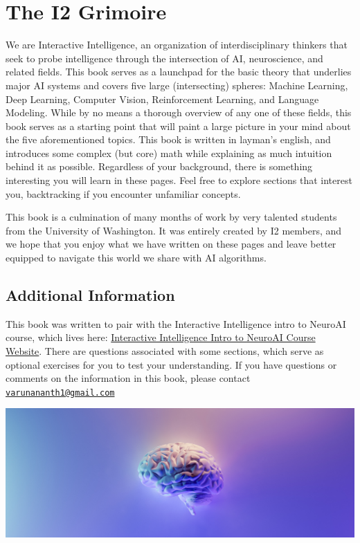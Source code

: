 \documentclass{article}
\begin{document}
\begingroup
\section*{The I2 Grimoire}
We are Interactive Intelligence, an organization of interdisciplinary
thinkers that seek to probe intelligence through the intersection of
AI, neuroscience, and related fields. This book serves as a launchpad
for the basic theory that underlies major AI systems and covers five
large (intersecting) spheres: Machine Learning, Deep Learning,
Computer Vision, Reinforcement Learning, and Language Modeling. While
by no means a thorough overview of any one of these fields, this book
serves as a starting point that will paint a large picture in your
mind about the five aforementioned topics. This book is written in
layman's english, and introduces some complex (but core) math while
explaining as much intuition behind it as possible. Regardless of
your background, there is something interesting you will learn in
these pages. Feel free to explore sections that interest you,
backtracking if you encounter unfamiliar concepts.

This book is a culmination of many months of work by very talented
students from the University of Washington. It was entirely created
by I2 members, and we hope that you enjoy what we have written on
these pages and leave better equipped to navigate this world we share
with AI algorithms.

\subsection*{Additional Information}
This book was written to pair with the Interactive Intelligence intro
to NeuroAI course, which lives here:
\href{https://course.uw-i2.org/}{Interactive Intelligence Intro to
NeuroAI Course Website}. There are questions associated with some
sections, which serve as optional exercises for you to test your
understanding. If you have questions or comments on the information
in this book, please contact
\href{mailto:varunananth1@gmail.com}{\texttt{varunananth1@gmail.com}} \\
\vspace{2cm}
\begin{center}
  \includegraphics[width=\linewidth]{other/i2-brain.png}
\end{center}
\endgroup
\end{document}
